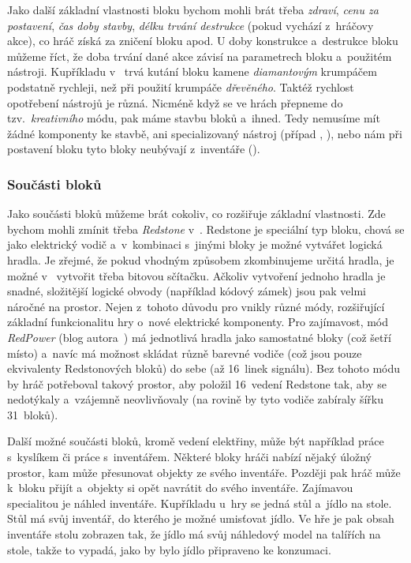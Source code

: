 Jako další základní vlastnosti bloku bychom mohli brát třeba \textit{zdraví}, \textit{cenu za postavení}, \textit{čas doby stavby}, \textit{délku trvání destrukce} (pokud vychází z~hráčovy akce), co hráč získá za zničení bloku apod. U doby konstrukce a~destrukce bloku můžeme říct, že doba trvání dané akce závisí na parametrech bloku a~použitém nástroji. Kupříkladu v~ trvá kutání bloku kamene \textit{diamantovým} krumpáčem podstatně rychleji, než při použití krumpáče \textit{dřevěného}. Taktéž rychlost opotřebení nástrojů je různá. Nicméně když se ve hrách přepneme do tzv.~\textit{kreativního} módu, pak máme stavbu bloků  a~ihned. Tedy nemusíme mít žádné komponenty ke stavbě, ani specializovaný nástroj (případ \SE{}, \ME{}), nebo nám při postavení bloku tyto bloky neubývají z~inventáře (\MC{}). 

\subsubsection{Součásti bloků}
Jako součásti bloků můžeme brát cokoliv, co rozšiřuje základní vlastnosti. Zde bychom mohli zmínit třeba \textit{Redstone} v~. Redstone je speciální typ bloku, chová se jako elektrický vodič a~v~kombinaci s~jinými bloky je možné vytvářet logická hradla. Je zřejmé, že pokud vhodným způsobem zkombinujeme určitá hradla, je možné v~ vytvořit třeba bitovou sčítačku. Ačkoliv vytvoření jednoho hradla je snadné, složitější logické obvody (například kódový zámek) jsou pak velmi náročné na prostor. Nejen z~tohoto důvodu pro \MC{} vnikly různé módy, rozšiřující základní funkcionalitu hry o~nové elektrické komponenty. Pro zajímavost, mód \textit{RedPower} (blog autora~\citep{eloraam}) má jednotlivá hradla jako samostatné bloky (což šetří místo) a~navíc má možnost skládat různě barevné vodiče (což jsou pouze ekvivalenty Redstonových bloků) do sebe (až 16~linek signálu). Bez tohoto módu by hráč potřeboval takový prostor, aby položil 16~vedení Redstone tak, aby se nedotýkaly a~vzájemně neovlivňovaly (na rovině by tyto vodiče zabíraly šířku 31~bloků). 

Další možné součásti bloků, kromě vedení elektřiny, může být například práce s~kyslíkem či práce s~inventářem. Některé bloky hráči nabízí nějaký úložný prostor, kam může přesunovat objekty ze svého inventáře. Později pak hráč může k~bloku přijít a~objekty si opět navrátit do svého inventáře. Zajímavou specialitou je náhled inventáře. Kupříkladu u~hry \ME{} se jedná stůl a~jídlo na stole. Stůl má svůj inventář, do kterého je možné umisťovat jídlo. Ve hře je pak obsah inventáře stolu zobrazen tak, že jídlo má svůj náhledový model na talířích na stole, takže to vypadá, jako by bylo jídlo připraveno ke konzumaci. 


